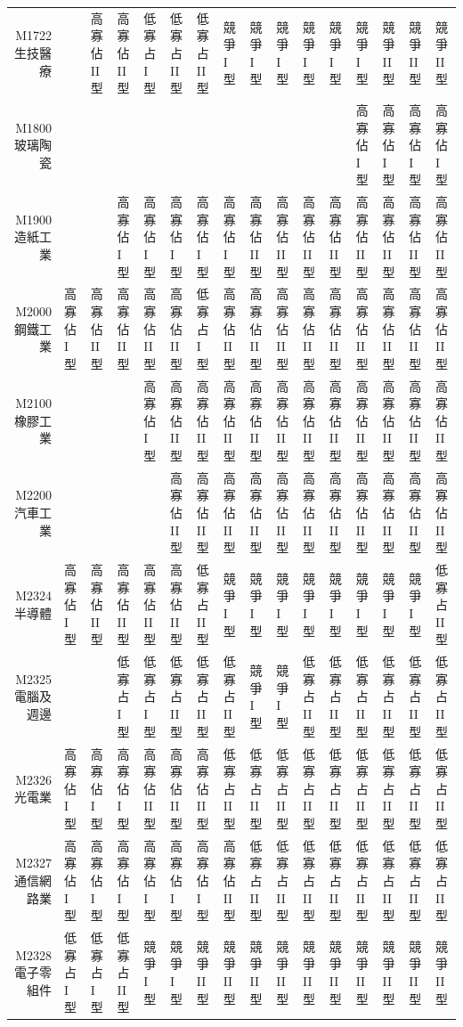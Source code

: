 \documentclass[a4paper,14pt]{article}\usepackage[]{graphicx}\usepackage[]{color}
\begin{document}
\begin{landscape}
\begin{table}[ht]
{\begin{tabular}{rlllllllllllllll}
  M1722生技醫療 &  & 高寡佔II 型 & 高寡佔II 型 & 低寡占I 型 & 低寡占II 型 & 低寡占II 型 & 競爭I 型 & 競爭I 型 & 競爭I 型 & 競爭I 型 & 競爭I 型 & 競爭I 型 & 競爭II 型 & 競爭II 型 & 競爭II 型 \\ 
  M1800玻璃陶瓷 &  &  &  &  &  &  &  &  &  &  &  & 高寡佔I 型 & 高寡佔I 型 & 高寡佔I 型 & 高寡佔I 型 \\ 
  M1900造紙工業 &  &  & 高寡佔I 型 & 高寡佔I 型 & 高寡佔I 型 & 高寡佔I 型 & 高寡佔I 型 & 高寡佔II 型 & 高寡佔II 型 & 高寡佔II 型 & 高寡佔II 型 & 高寡佔II 型 & 高寡佔II 型 & 高寡佔II 型 & 高寡佔II 型 \\ 
  M2000鋼鐵工業 & 高寡佔I 型 & 高寡佔II 型 & 高寡佔II 型 & 高寡佔II 型 & 高寡佔II 型 & 低寡占I 型 & 高寡佔II 型 & 高寡佔II 型 & 高寡佔II 型 & 高寡佔II 型 & 高寡佔II 型 & 高寡佔II 型 & 高寡佔II 型 & 高寡佔II 型 & 高寡佔II 型 \\ 
  M2100橡膠工業 &  &  &  & 高寡佔I 型 & 高寡佔II 型 & 高寡佔II 型 & 高寡佔II 型 & 高寡佔II 型 & 高寡佔II 型 & 高寡佔II 型 & 高寡佔II 型 & 高寡佔II 型 & 高寡佔II 型 & 高寡佔II 型 & 高寡佔II 型 \\ 
  M2200汽車工業 &  &  &  &  & 高寡佔II 型 & 高寡佔II 型 & 高寡佔II 型 & 高寡佔II 型 & 高寡佔II 型 & 高寡佔II 型 & 高寡佔II 型 & 高寡佔II 型 & 高寡佔II 型 & 高寡佔II 型 & 高寡佔II 型 \\ 
  M2324半導體 & 高寡佔I 型 & 高寡佔II 型 & 高寡佔II 型 & 高寡佔II 型 & 高寡佔II 型 & 低寡占II 型 & 競爭I 型 & 競爭I 型 & 競爭I 型 & 競爭I 型 & 競爭I 型 & 競爭I 型 & 競爭I 型 & 競爭I 型 & 低寡占II 型 \\ 
  M2325電腦及週邊 &  &  & 低寡占I 型 & 低寡占I 型 & 低寡占II 型 & 低寡占II 型 & 低寡占II 型 & 競爭I 型 & 競爭I 型 & 低寡占II 型 & 低寡占II 型 & 低寡占II 型 & 低寡占II 型 & 低寡占II 型 & 低寡占II 型 \\ 
  M2326光電業 & 高寡佔I 型 & 高寡佔I 型 & 高寡佔I 型 & 高寡佔II 型 & 高寡佔II 型 & 高寡佔II 型 & 低寡占II 型 & 低寡占II 型 & 低寡占II 型 & 低寡占II 型 & 低寡占II 型 & 低寡占II 型 & 低寡占II 型 & 低寡占II 型 & 低寡占II 型 \\ 
  M2327通信網路業 & 高寡佔I 型 & 高寡佔I 型 & 高寡佔I 型 & 高寡佔I 型 & 高寡佔I 型 & 高寡佔I 型 & 高寡佔II 型 & 低寡占II 型 & 低寡占II 型 & 低寡占II 型 & 低寡占II 型 & 低寡占II 型 & 低寡占II 型 & 低寡占II 型 & 低寡占II 型 \\ 
  M2328電子零組件 & 低寡占I 型 & 低寡占I 型 & 低寡占II 型 & 競爭I 型 & 競爭I 型 & 競爭II 型 & 競爭II 型 & 競爭II 型 & 競爭II 型 & 競爭II 型 & 競爭II 型 & 競爭II 型 & 競爭II 型 & 競爭II 型 & 競爭II 型 \\ 

\end{tabular}}
\end{table}
\end{landscape}
\end{document}
